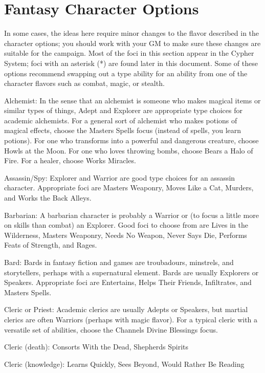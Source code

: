 \chapter{Fantasy Character Options}

In some cases, the ideas here require minor changes to the flavor described in the character options; you should work with your GM to make sure these changes are suitable for the campaign. Most of the foci in this section appear in the Cypher System; foci with an asterisk (*) are found later in this document. Some of these options recommend swapping out a type ability for an ability from one of the character flavors such as combat, magic, or stealth. 

Alchemist: In the sense that an alchemist is someone who makes magical items or similar types of things, Adept and Explorer are appropriate type choices for academic alchemists. For a general sort of alchemist who makes potions of magical effects, choose the Masters Spells focus (instead of spells, you learn potions). For one who transforms into a powerful and dangerous creature, choose Howls at the Moon. For one who loves throwing bombs, choose Bears a Halo of Fire. For a healer, choose Works Miracles.

Assassin/Spy: Explorer and Warrior are good type choices for an assassin character. Appropriate foci are Masters Weaponry, Moves Like a Cat, Murders, and Works the Back Alleys. 

Barbarian: A barbarian character is probably a Warrior or (to focus a little more on skills than combat) an Explorer. Good foci to choose from are Lives in the Wilderness, Masters Weaponry, Needs No Weapon, Never Says Die, Performs Feats of Strength, and Rages. 

Bard: Bards in fantasy fiction and games are troubadours, minstrels, and storytellers, perhaps with a supernatural element. Bards are usually Explorers or 
Speakers. Appropriate foci are Entertains, Helps Their Friends, Infiltrates, and Masters Spells. 

Cleric or Priest: Academic clerics are usually Adepts or Speakers, but martial clerics are often Warriors (perhaps with magic flavor). For a typical cleric with a versatile set of abilities, choose the Channels Divine Blessings focus. 

Cleric (death): Consorts With the Dead, Shepherds Spirits 

Cleric (knowledge): Learns Quickly, Sees Beyond, Would Rather Be Reading 

